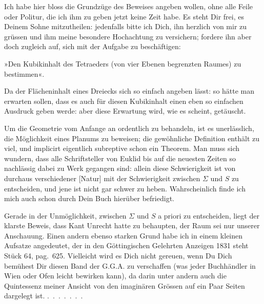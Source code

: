 %
Ich habe hier bloss die Grundzüge des Beweises angeben wollen, ohne alle Feile oder Politur, die ich ihm zu geben jetzt keine Zeit habe. Es steht Dir frei, es Deinem Sohne mitzutheilen: jedenfalls bitte ich Dich, ihn herzlich von mir zu grüssen und ihm meine besondere Hochachtung zu versichern; fordere ihn aber doch zugleich auf, sich mit der Aufgabe zu beschäftigen:

»Den Kubikinhalt des Tetraeders (von vier Ebenen begrenzten Raumes) zu bestimmen«.

Da der Flächeninhalt eines Dreiecks sich so einfach angeben lässt: so hätte man erwarten sollen, dass es auch für diesen Kubikinhalt einen eben so einfachen Ausdruck geben werde: aber diese Erwartung wird, wie es scheint, getäuscht.

Um die Geometrie vom Anfange an ordentlich zu behandeln, ist es unerlässlich, die Möglichkeit eines Planums zu beweisen; die gewöhnliche Definition enthält zu viel, und implicirt eigentlich subreptive schon ein Theorem. Man muss sich wundern, dass alle Schriftsteller von Euklid bis auf die neuesten Zeiten so nachlässig dabei zu Werk gegangen sind: allein diese Schwierigkeit ist von durchaus verschiedener [Natur] mit der Schwierigkeit zwischen $\Sigma$ und $S$ zu entscheiden, und jene ist nicht gar schwer zu heben. Wahrscheinlich finde ich mich auch schon durch Dein Buch hierüber befriedigt.

Gerade in der Unmöglichkeit, zwischen $\Sigma$ und $S$ a priori zu entscheiden, liegt der klarste Beweis, dass Kant Unrecht hatte zu behaupten, der Raum sei nur  unserer Anschauung. Einen andern ebenso starken Grund habe ich in einem kleinen Aufsatze angedeutet, der in den Göttingischen Gelehrten Anzeigen 1831 steht Stück 64, pag.~625. Vielleicht wird es Dich nicht gereuen, wenn Du Dich bemühest Dir diesen Band der G.G.A. zu verschaffen (was jeder Buchhändler in Wien oder Ofen leicht bewirken kann), da darin unter andern auch die Quintessenz meiner Ansicht von den imaginären Grössen auf ein Paar Seiten dargelegt ist. \mbox{.\ .\ .\ .\ .\ .\ .}

